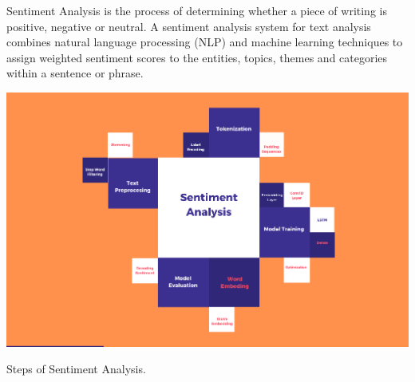 

    Sentiment Analysis is the process of determining whether a piece of writing is positive, negative or neutral. A sentiment analysis system for text analysis combines natural language processing (NLP) and machine learning techniques to assign weighted sentiment scores to the entities, topics, themes and categories within a sentence or phrase.

\begin{center}
\includegraphics[scale=0.6]{sentimentanalysis.png}
\end{center}
\begin{center}
Steps of Sentiment Analysis.
\end{center}
